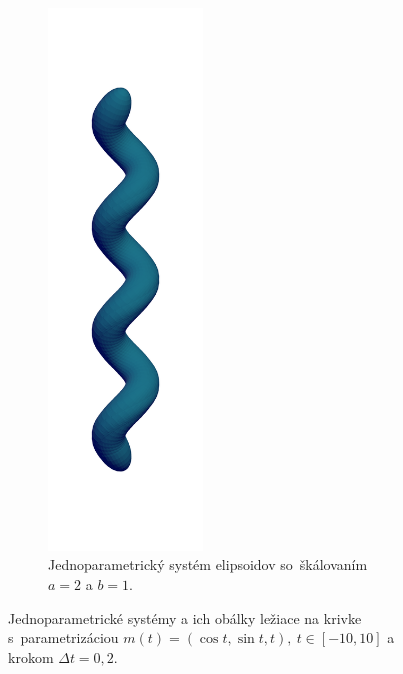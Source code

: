 \documentclass[12pt, twoside]{book}
\begin{document}
\begin{figure}[t!]
\begin{subfigure}[t]{0.32\textwidth}
        \includegraphics[width=0.45\textwidth, trim=0mm 80mm 0mm 80mm, clip=true]{images/helix_ellipsoids.png}
        	\caption{Jednoparametrický systém elipsoidov so~škálovaním $a=2$ a $b=1$.}
        \label{fig:plocha9}
    \end{subfigure}
    	\caption[Jednoparametrické systémy a ich obálky ležiace na krivke skrutkovica.]{Jednoparametrické systémy a ich obálky ležiace na krivke s~parametrizáciou  $m(t)=(\cos t, \sin t, t), \  t \in [-10, 10]$ a krokom $\Delta t = 0,2$.}
    \label{fig:katalogII}
\end{figure}
\end{document}
